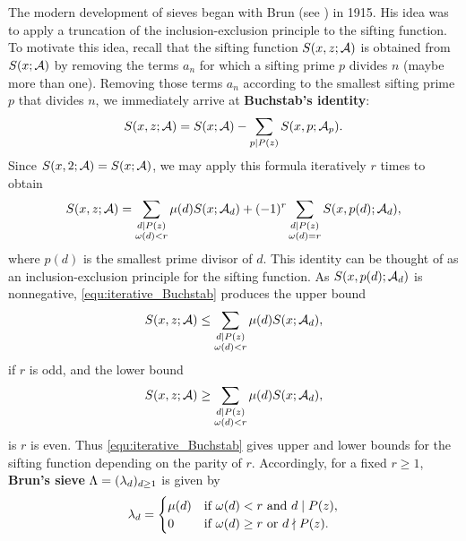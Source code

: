 \documentclass[12pt,oneside]{book}
\begin{document}
  \section{}
    The modern development of sieves began with Brun (see \cite{brun1915uber}) in 1915. His idea was to apply a truncation of the inclusion-exclusion principle to the sifting function. To motivate this idea, recall that the sifting function $S(x,z;\mathcal{A})$ is obtained from $S(x;\mathcal{A})$ by removing the terms $a_{n}$ for which a sifting prime $p$ divides $n$ (maybe more than one). Removing those terms $a_{n}$ according to the smallest sifting prime $p$ that divides $n$, we immediately arrive at \textbf{Buchstab's identity}:
    \[
      S(x,z;\mathcal{A}) = S(x;\mathcal{A})-\sum_{p \mid P(z)}S(x,p;\mathcal{A}_{p}).
    \]
    Since $S(x,2;\mathcal{A}) = S(x;\mathcal{A})$, we may apply this formula iteratively $r$ times to obtain
    \begin{equation}\label{equ:iterative_Buchstab}
      S(x,z;\mathcal{A}) = \sum_{\substack{d \mid P(z) \\ \omega(d) < r}}\mu(d)S(x;\mathcal{A}_{d})+(-1)^{r}\sum_{\substack{d \mid P(z) \\ \omega(d) = r}}S(x,p(d);\mathcal{A}_{d}),
    \end{equation}
    where $p(d)$ is the smallest prime divisor of $d$. This identity can be thought of as an inclusion-exclusion principle for the sifting function. As $S(x,p(d);\mathcal{A}_{d})$ is nonnegative, \cref{equ:iterative_Buchstab} produces the upper bound
    \begin{equation}\label{equ:iterative_Buchstab_odd}
      S(x,z;\mathcal{A}) \le \sum_{\substack{d \mid P(z) \\ \omega(d) < r}}\mu(d)S(x;\mathcal{A}_{d}),
    \end{equation}
    if $r$ is odd, and the lower bound
    \begin{equation}\label{equ:iterative_Buchstab_even}
      S(x,z;\mathcal{A}) \ge \sum_{\substack{d \mid P(z) \\ \omega(d) < r}}\mu(d)S(x;\mathcal{A}_{d}),
    \end{equation}
    is $r$ is even. Thus \cref{equ:iterative_Buchstab} gives upper and lower bounds for the sifting function depending on the parity of $r$. Accordingly, for a fixed $r \ge 1$, \textbf{Brun's sieve} $\Lambda = (\lambda_{d})_{d \ge 1}$ is given by
    \[
      \lambda_{d} = \begin{cases} \mu(d) & \text{if $\omega(d) < r$ and $d \mid P(z)$}, \\ 0 & \text{if $\omega(d) \ge r$ or $d \nmid P(z)$}. \end{cases}
    \]
\end{document}
